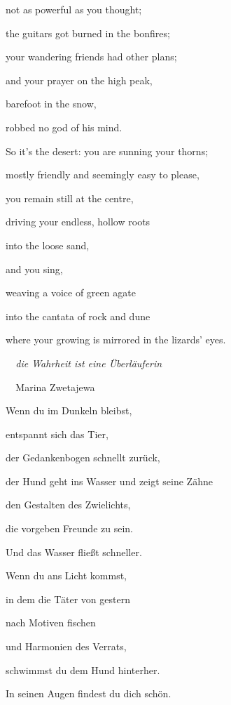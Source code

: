 \documentclass[a4paper]{article}
\begin{document}
not as powerful as you thought;

the guitars got burned in the bonfires;

your wandering friends had other plans;

and your prayer on the high peak,

barefoot in the snow,

robbed no god of his mind.


\bigskip

So it’s the desert: you are sunning your thorns;

mostly friendly and seemingly easy to please,

you remain still at the centre, 

driving your endless, hollow roots

into the loose sand,

and you sing,

weaving a voice of green agate 

into the cantata of rock and dune

where your growing is mirrored in the lizards’ eyes.


\bigskip



\bigskip

{\itshape
\ \ die Wahrheit ist eine Überläuferin}

\textit{\ \ }Marina Zwetajewa


\bigskip


\bigskip

Wenn du im Dunkeln bleibst,

entspannt sich das Tier,

der Gedankenbogen schnellt zurück,

der Hund geht ins Wasser und zeigt seine Zähne 

den Gestalten des Zwielichts, \ 

die vorgeben Freunde zu sein.


\bigskip

Und das Wasser fließt schneller.


\bigskip

Wenn du ans Licht kommst,

in dem die Täter von gestern

nach Motiven fischen

und Harmonien des Verrats,

schwimmst du dem Hund hinterher.

In seinen Augen findest du dich schön.
\end{document}
